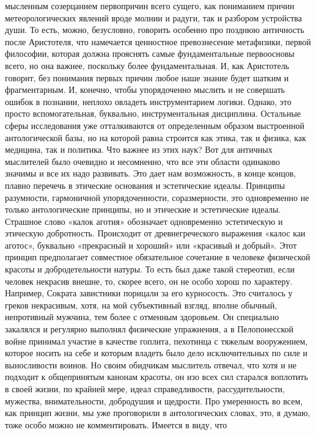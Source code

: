 мысленным созерцанием первопричин всего сущего, как пониманием причин
метеорологических явлений вроде молнии и радуги, так и разбором устройства души.
То есть, можно, безусловно, говорить особенно про позднюю античность после
Аристотеля, что намечается ценностное превознесение метафизики, первой
философии, которая должна прояснять самые фундаментальные первоосновы всего, но
она важнее, поскольку более фундаментальная. И, как Аристотель говорит, без
понимания первых причин любое наше знание будет шатким и фрагментарным. И,
конечно, чтобы упорядоченно мыслить и не совершать ошибок в познании, неплохо
овладеть инструментарием логики. Однако, это просто вспомогательная, буквально,
инструментальная дисциплина. Остальные сферы исследования уже отталкиваются от
определенным образом выстроенной антологической базы, но на которой равна
строится как этика, так и физика, как медицина, так и политика. Что важнее из
этих наук? Вот для античных мыслителей было очевидно и несомненно, что все эти
области одинаково значимы и все их надо развивать. Это дает нам возможность, в
конце концов, плавно перечечь в этические основания и эстетические идеалы.
Принципы разумности, гармоничной упорядоченности, соразмерности, это
одновременно не только антологические принципы, но и этические и эстетические
идеалы. Страшное слово «калок аготия» обозначает одновременно эстетическую и
этическую добротность. Происходит от древнегреческого выражения «калос каи
аготос», буквально «прекрасный и хороший» или «красивый и добрый». Этот принцип
предполагает совместное обязательное сочетание в человеке физической красоты и
добродетельности натуры. То есть был даже такой стереотип, если человек некрасив
внешне, то, скорее всего, он не особо хорош по характеру. Например, Сократа
завистники порицали за его курносость. Это считалось у греков некрасивым, хотя,
на мой субъективный взгляд, вполне обычный, непротивный мужчина, тем более с
отменным здоровьем. Он специально закалялся и регулярно выполнял физические
упражнения, а в Пелопонесской войне принимал участие в качестве гоплита,
пехотинца с тяжелым вооружением, которое носить на себе и которым владеть было
дело исключительных по силе и выносливости воинов. Но своим обидчикам мыслитель
отвечал, что хотя и не подходит к общепринятым канонам красоты, он изо всех сил
старался воплотить в своей жизни, по крайней мере, идеал справедливости,
рассудительности, мужества, внимательности, добродушия и щедрости. Про
умеренность во всем, как принцип жизни, мы уже проговорили в антологических
словах, это, я думаю, тоже особо можно не комментировать. Имеется в виду, что
